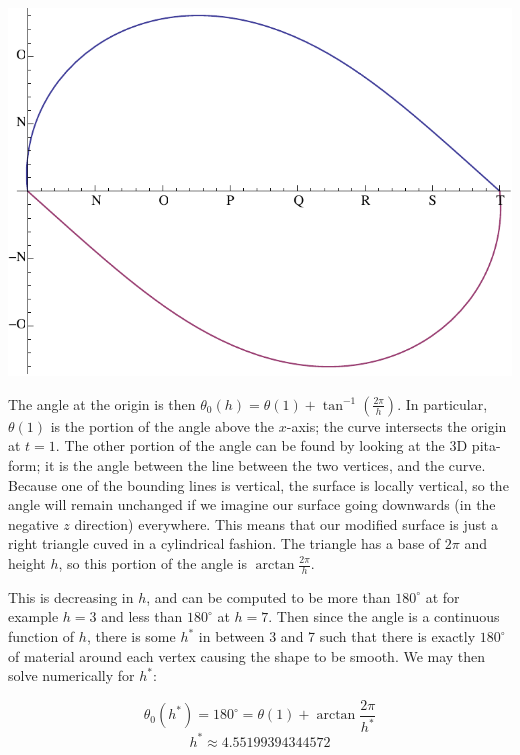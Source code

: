 \documentclass[12pt]{article}
\begin{document}
\begin{center}
\includegraphics[scale=.4]{unfold_h=7.pdf}
\end{center}

The angle at the origin is then $\theta_0(h)=\theta(1)+\tan^{-1}\left(\frac{2\pi}{h}\right)$.  In particular, $\theta(1)$ is the portion of the angle above the $x$-axis; the curve intersects the origin at $t=1$.  The other portion of the angle can be found by looking at the 3D pita-form; it is the angle between the line between the two vertices, and the curve.  Because one of the bounding lines is vertical, the surface is locally vertical, so the angle will remain unchanged if we imagine our surface going downwards (in the negative $z$ direction) everywhere. This means that our modified surface is just a right triangle cuved in a cylindrical fashion. The triangle has a base of $2\pi$ and height $h$, so this portion of the angle is $\arctan \frac{2\pi}{h}$.

This is decreasing in $h$, and can be computed to be more than $180^\circ$ at for example $h=3$ and less than $180^\circ$ at $h=7$.  Then since the angle is a continuous function of $h$, there is some $h^*$ in between 3 and 7 such that there is exactly $180^\circ$ of material around each vertex causing the shape to be smooth.  We may then solve numerically for $h^*$:

$$ \theta_0(h^*)= 180^\circ= \theta(1)+\arctan \frac{2\pi}{h^*}$$
$$h^*\approx 4.55199394344572$$
\end{document}
